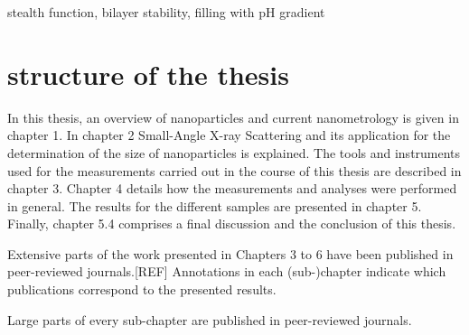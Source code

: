 stealth function, bilayer stability, filling with pH gradient

\section{structure of the thesis}

In this thesis, an overview of nanoparticles and current nanometrology is given in chapter 1. In chapter 2 Small-Angle X-ray Scattering and its application for the determination of the size of nanoparticles is explained. The tools and instruments used for the measurements carried out in the course of this thesis are described in chapter 3. Chapter 4 details how the measurements and analyses were performed
in general. The results for the different samples are presented in chapter 5. Finally, chapter 5.4 comprises a final discussion and the conclusion of this thesis.

Extensive parts of the work presented in Chapters 3 to 6 have been published in peer-reviewed journals.[REF] Annotations in each (sub-)chapter indicate which publications correspond to the presented results.

Large parts of every sub-chapter are published in peer-reviewed journals.

